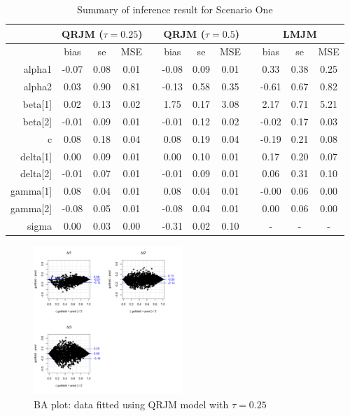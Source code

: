 \documentclass{article}
\begin{document}
\begin{table}[H]
\centering
\caption{Summary of inference result for Scenario One}
\begin{tabular}{rccccccccccc}
\hline
& \multicolumn{3}{c}{QRJM ($\tau=0.25$)} & &\multicolumn{3}{c}{QRJM ($\tau=0.5$)} & & \multicolumn{3}{c}{LMJM}\\
\hline
 & bias & se & MSE & & bias & se & MSE & & bias & se & MSE \\
 \cline{2-4}  \cline{6-8}  \cline{10-12}
  alpha1 & -0.07 & 0.08 & 0.01 & & -0.08 & 0.09 & 0.01 & & 0.33 & 0.38 & 0.25 \\
  alpha2 & 0.03 & 0.90 & 0.81 & & -0.13 & 0.58 & 0.35 & & -0.61 & 0.67 & 0.82 \\
  beta[1] & 0.02 & 0.13 & 0.02 & & 1.75 & 0.17 & 3.08 & & 2.17 & 0.71 & 5.21 \\
  beta[2] & -0.01 & 0.09 & 0.01 & & -0.01 & 0.12 & 0.02 & & -0.02 & 0.17 & 0.03 \\
  c & 0.08 & 0.18 & 0.04 & & 0.08 & 0.19 & 0.04 & & -0.19 & 0.21 & 0.08 \\
  delta[1] & 0.00 & 0.09 & 0.01 & & 0.00 & 0.10 & 0.01 & & 0.17 & 0.20 & 0.07 \\
  delta[2] & -0.01 & 0.07 & 0.01 & & -0.01 & 0.09 & 0.01 & & 0.06 & 0.31 & 0.10 \\
  gamma[1] & 0.08 & 0.04 & 0.01 & & 0.08 & 0.04 & 0.01 & & -0.00 & 0.06 & 0.00 \\
  gamma[2] & -0.08 & 0.05 & 0.01 & & -0.08 & 0.04 & 0.01 & & 0.00 & 0.06 & 0.00 \\
  sigma & 0.00 & 0.03 & 0.00 & & -0.31 & 0.02 & 0.10 & & - & - & - \\
   \hline
\end{tabular}
\end{table}

\begin{figure}[H]
\centering
\includegraphics[width=0.5\textwidth]{ba_qt25data_qt25fit.pdf}
\caption{BA plot: data fitted using QRJM model with $\tau=0.25$}
\end{figure}
\end{document}

